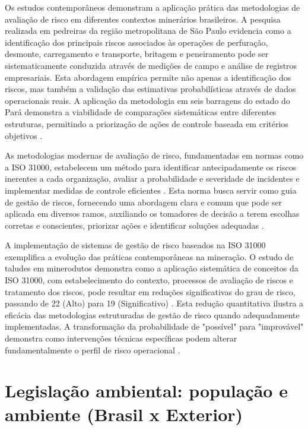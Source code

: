 Os estudos contemporâneos demonstram a aplicação prática das metodologias de avaliação de risco em diferentes contextos minerários brasileiros. A pesquisa realizada em pedreiras da região metropolitana de São Paulo evidencia como a identificação dos principais riscos associados às operações de perfuração, desmonte, carregamento e transporte, britagem e peneiramento \cite{iramina2009} pode ser sistematicamente conduzida através de medições de campo e análise de registros empresariais. Esta abordagem empírica permite não apenas a identificação dos riscos, mas também a validação das estimativas probabilísticas através de dados operacionais reais. A aplicação da metodologia em seis barragens do estado do Pará demonstra a viabilidade de comparações sistemáticas entre diferentes estruturas, permitindo a priorização de ações de controle baseada em critérios objetivos \cite{conceicao2018}.

As metodologias modernas de avaliação de risco, fundamentadas em normas como a ISO 31000, estabelecem um método para identificar antecipadamente os riscos inerentes a cada organização, avaliar a probabilidade e severidade de incidentes e implementar medidas de controle eficientes \cite{cruz2024iso}. Esta norma busca servir como guia de gestão de riscos, fornecendo uma abordagem clara e comum que pode ser aplicada em diversos ramos, auxiliando os tomadores de decisão a terem escolhas corretas e conscientes, priorizar ações e identificar soluções adequadas \cite{ministeriotransportes2018}.

A implementação de sistemas de gestão de risco baseados na ISO 31000 exemplifica a evolução das práticas contemporâneas na mineração. O estudo de taludes em minerodutos demonstra como a aplicação sistemática de conceitos da ISO 31000, com estabelecimento do contexto, processos de avaliação de riscos e tratamento dos riscos, pode resultar em reduções significativas do grau de risco, passando de 22 (Alto) para 19 (Significativo) \cite{vilaca2021}. Esta redução quantitativa ilustra a eficácia das metodologias estruturadas de gestão de risco quando adequadamente implementadas. A transformação da probabilidade de "possível" para "improvável" demonstra como intervenções técnicas específicas podem alterar fundamentalmente o perfil de risco operacional \cite{vilaca2021}.

\section{Legislação ambiental: população e ambiente (Brasil x Exterior)}
\label{sec:legislacao}

